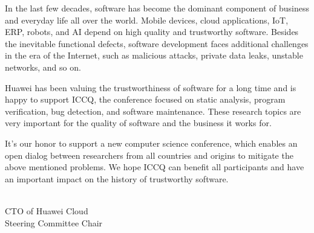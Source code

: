 
\clearpage
{}

In the last few decades, software has become the dominant component of business and everyday life all over the world. Mobile devices, cloud applications, IoT, ERP, robots, and AI depend on high quality and trustworthy software. Besides the inevitable functional defects, software development faces additional challenges in the era of the Internet, such as malicious attacks, private data leaks, unstable networks, and so on.

Huawei has been valuing the trustworthiness of software for a long time and is happy to support ICCQ, the conference focused on static analysis, program verification, bug detection, and software maintenance. These research topics are very important for the quality of software and the business it works for.

It's our honor to support a new computer science conference, which enables an open dialog between researchers from all countries and origins to mitigate the above mentioned problems. We hope ICCQ can benefit all participants and have an important impact on the history of trustworthy software.

 \\
CTO of Huawei Cloud \\
Steering Committee Chair
